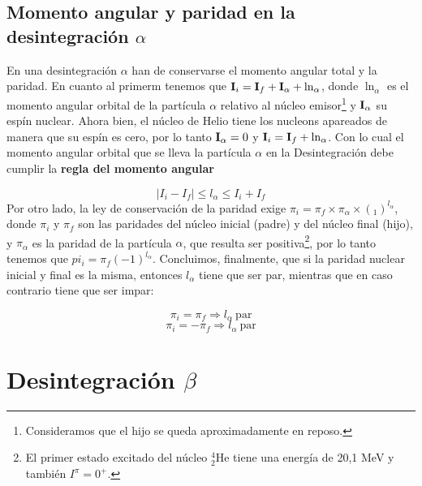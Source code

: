 
\subsection{Momento angular y paridad en la desintegración $\alpha$}

En una desintegración $\alpha$ han de conservarse el momento angular total y la paridad. En cuanto al primerm tenemos que $\mathbf{I}_i = \mathbf{I}_f + \mathbf{I}_\alpha + \ln_\alpha$, donde $\ln_\alpha$ es el momento angular orbital de la partícula $\alpha$ relativo al núcleo emisor\footnote{Consideramos que el hijo se queda aproximadamente en reposo.} y $\mathbf{I}_\alpha$ su espín nuclear. Ahora bien, el núcleo de Helio tiene los nucleons apareados de manera que su espín es cero, por lo tanto $\mathbf{I}_\alpha  =0$ y $\mathbf{I}_i = \mathbf{I}_f + \ln_\alpha$. Con lo cual el momento angular orbital que se lleva la partícula $\alpha$ en la Desintegración debe cumplir la \textbf{regla del momento angular}

\begin{equation}
    |I_i-I_f|\leq l_\alpha \leq I_i + I_f
\end{equation}
Por otro lado, la ley de conservación de la paridad exige $\pi_i=\pi_f \times \pi_\alpha \times (_1)^{l_\alpha}$, donde $\pi_i$ y $\pi_f$ son las paridades del núcleo inicial (padre) y del núcleo final (hijo), y $\pi_\alpha$ es la paridad de la partícula $\alpha$, que resulta ser positiva\footnote{El primer estado excitado del núcleo $^4_2$He tiene una energía de 20,1 MeV y también $I^\pi = 0^+$.}, por lo tanto tenemos que $pi_i = \pi_f (-1)^{l_\alpha}$. Concluimos, finalmente, que si la paridad nuclear inicial y final es la misma, entonces $l_\alpha$ tiene que ser par, mientras que en caso contrario tiene que ser impar:

\begin{equation}
    \pi_i = \pi_f \Longrightarrow l_\alpha \ \text{par}
\end{equation}
\begin{equation*}
    \pi_i = - \pi_f \Longrightarrow l_\alpha \ \text{par}
\end{equation*}



\section{Desintegración $\beta$}

